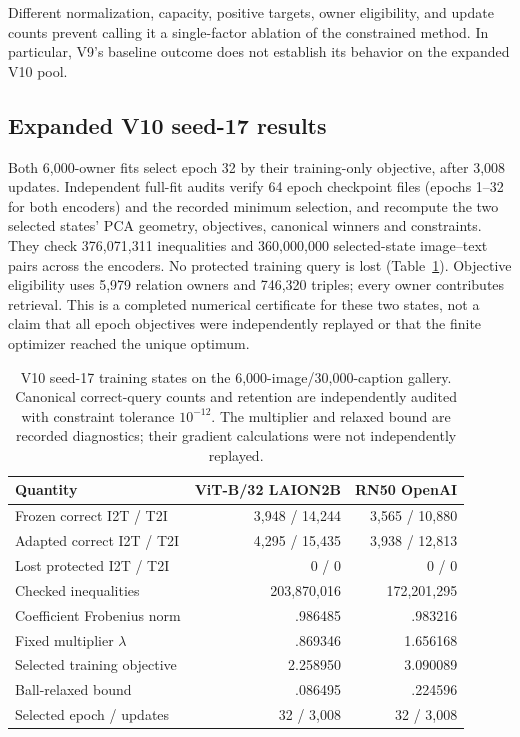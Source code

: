 \documentclass[11pt]{article}
\begin{document}
\begin{samepage}
Different normalization,
capacity, positive targets, owner eligibility, and update counts prevent
calling it a single-factor ablation of the constrained method. In
particular, V9's baseline outcome does not establish its behavior on the
expanded V10 pool.\par
\end{samepage}

\subsection{Expanded V10 seed-17 results}
Both 6,000-owner fits select epoch 32 by their training-only objective,
after 3,008 updates. Independent full-fit audits verify 64 epoch checkpoint
files (epochs 1--32 for both encoders) and the recorded minimum selection,
and recompute the two selected
states' PCA geometry, objectives, canonical winners and constraints.
They check 376,071,311 inequalities and 360,000,000 selected-state
image--text pairs across the encoders. No protected training query is
lost (Table~\ref{tab:v10certificate}). Objective eligibility uses 5,979
relation owners and 746,320 triples; every owner contributes retrieval.
This is a completed numerical certificate for these two states, not a
claim that all epoch objectives were independently replayed or that the
finite optimizer reached the unique optimum.

\begin{table}[t]\centering\small
\caption{V10 seed-17 training states on the 6,000-image/30,000-caption
gallery. Canonical correct-query counts and retention are independently
audited with constraint tolerance $10^{-12}$. The multiplier and relaxed
bound are recorded diagnostics; their gradient calculations were not
independently replayed.}\label{tab:v10certificate}
\begin{tabular}{lrr}
\toprule
Quantity & ViT-B/32 LAION2B & RN50 OpenAI\\
\midrule
Frozen correct I2T / T2I & 3,948 / 14,244 & 3,565 / 10,880\\
Adapted correct I2T / T2I & 4,295 / 15,435 & 3,938 / 12,813\\
Lost protected I2T / T2I & 0 / 0 & 0 / 0\\
Checked inequalities & 203,870,016 & 172,201,295\\
Coefficient Frobenius norm & .986485 & .983216\\
Fixed multiplier $\lambda$ & .869346 & 1.656168\\
Selected training objective & 2.258950 & 3.090089\\
Ball-relaxed bound & .086495 & .224596\\
Selected epoch / updates & 32 / 3,008 & 32 / 3,008\\
\bottomrule
\end{tabular}
\end{table}
\end{document}
